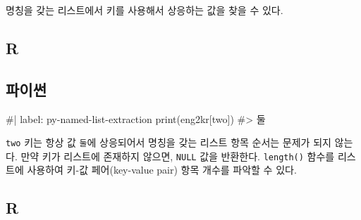 \documentclass[
  letterpaper,
]{book}
\newenvironment{Shaded}{\begin{snugshade}}{\end{snugshade}}
\newcommand{\NormalTok}[1]{\textcolor[rgb]{0.00,0.23,0.31}{#1}}
\begin{document}
명칭을 갖는 리스트에서 키를 사용해서 상응하는 값을 찾을 수 있다.

\subsection{R}

\begin{Shaded}
\end{Shaded}

\subsection{파이썬}

\begin{Shaded}
\begin{Highlighting}[]
\NormalTok{\#| label: py{-}named{-}list{-}extraction}
\NormalTok{print(eng2kr[\textquotesingle{}two\textquotesingle{}])}
\NormalTok{\#\textgreater{} 둘}
\end{Highlighting}
\end{Shaded}

\texttt{\textquotesingle{}two\textquotesingle{}} 키는 항상 값
\texttt{\textquotesingle{}둘\textquotesingle{}}에 상응되어서 명칭을 갖는
리스트 항목 순서는 문제가 되지 않는다. 만약 키가 리스트에 존재하지
않으면, \texttt{NULL} 값을 반환한다. \texttt{length()} 함수를 리스트에
사용하여 키-값 페어(key-value pair) 항목 개수를 파악할 수 있다.
 

\subsection{R}

\begin{Shaded}
\end{Shaded}
\end{document}
